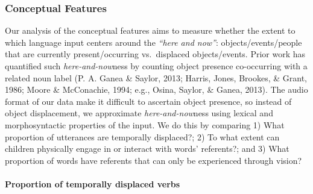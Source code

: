 \documentclass[
  man,floatsintext]{apa6}
\let\oldparagraph\paragraph
\renewcommand{\paragraph}[1]{\oldparagraph{#1}\mbox{}}
\begin{document}
\hypertarget{conceptual-features}{%
\subsubsection{Conceptual Features}\label{conceptual-features}}

Our analysis of the conceptual features aims to measure whether the extent to which language input centers around the \emph{``here and now''}: objects/events/people that are currently present/occurring vs.~displaced objects/events. Prior work has quantified such \emph{here-and-now}ness by counting object presence co-occurring with a related noun label (P. A. Ganea \& Saylor, 2013; Harris, Jones, Brookes, \& Grant, 1986; Moore \& McConachie, 1994; e.g., Osina, Saylor, \& Ganea, 2013). The audio format of our data make it difficult to ascertain object presence, so instead of object displacement, we approximate \emph{here-and-now}ness using lexical and morphosyntactic properties of the input. We do this by comparing 1) What proportion of utterances are temporally displaced?; 2) To what extent can children physically engage in or interact with words' referents?; and 3) What proportion of words have referents that can only be experienced through vision?

\hypertarget{proportion-of-temporally-displaced-verbs}{%
\paragraph{Proportion of temporally displaced verbs}\label{proportion-of-temporally-displaced-verbs}}
\end{document}

